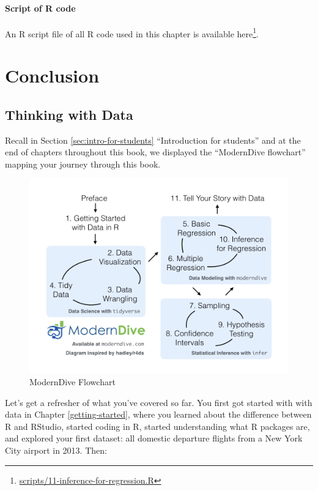 \documentclass[12pt,]{krantz}
\renewcommand{\href}[2]{#2\footnote{\url{#1}}}
\theoremstyle{definition}
\theoremstyle{definition}
\theoremstyle{definition}
\theoremstyle{remark}
\begin{document}
\subsection{Script of R code}\label{script-of-r-code-8}

An R script file of all R code used in this chapter is available
\href{scripts/11-inference-for-regression.R}{here}.

\part{Conclusion}\label{part-conclusion}

\chapter{Thinking with Data}\label{thinking-with-data}

Recall in Section \ref{sec:intro-for-students} ``Introduction for
students'' and at the end of chapters throughout this book, we displayed
the ``ModernDive flowchart'' mapping your journey through this book.

\begin{figure}

{\centering \includegraphics[width=\textwidth]{images/flowcharts/flowchart/flowchart.002} 

}

\caption{ModernDive Flowchart}\label{fig:moderndive-figure-conclusion}
\end{figure}

Let's get a refresher of what you've covered so far. You first got
started with with data in Chapter \ref{getting-started}, where you
learned about the difference between R and RStudio, started coding in R,
started understanding what R packages are, and explored your first
dataset: all domestic departure flights from a New York City airport in
2013. Then:
\end{document}
